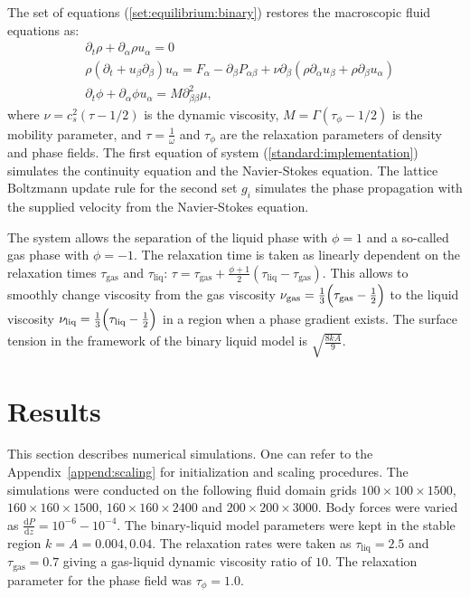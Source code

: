 \documentclass{article}
\begin{document}
The set of equations (\ref{set:equilibrium:binary}) restores the macroscopic
fluid equations as:
\begin{equation}
\label{full:navier:stokes}
\begin{aligned}
&\partial_t \rho+ \partial_{\alpha} \rho u_{\alpha}=0\\
&\rho\left(\partial_t+u_{\beta}\partial_{\beta}\right) u_{\alpha}=F_{\alpha}
-\partial_{\beta}P_{\alpha \beta} +
\nu\partial_{\beta}\left(\rho\partial_{\alpha}u_{\beta}+\rho\partial_{\beta} u_{\alpha}\right)\\
&\partial_t \phi + \partial_{\alpha} \phi u_{\alpha}=M \partial^2_{\beta\beta} \mu,
\end{aligned}
\end{equation}
where $\nu=c_s^2 (\tau-1/2)$ is the dynamic viscosity,
$M=\Gamma(\tau_{\phi}-1/2)$ is the mobility parameter, and $\tau=\frac{1}{\omega}$ and $\tau_{\phi}$
are the relaxation parameters of density and phase fields. The first equation of system
(\ref{standard:implementation}) simulates the continuity equation and the Navier-Stokes equation.
The lattice Boltzmann update rule for the second set $g_i$ simulates the phase propagation with the
supplied velocity from the Navier-Stokes equation.

The system allows the separation of the liquid
phase with $\phi=1$ and a so-called gas phase with $\phi=-1$. The
relaxation time is taken as linearly dependent on the relaxation
times $\tau_{\mathrm{gas}}$ and $\tau_{\mathrm{liq}}$:
$\tau=\tau_{\mathrm{gas}}+\frac{\phi+1}{2}(\tau_{\mathrm{liq}}-\tau_{\mathrm{gas}})$. This allows
to smoothly change viscosity from the gas viscosity
$\nu_{\mathrm{gas}}=\frac{1}{3}\Bigl(\tau_{\mathrm{gas}}-\frac{1}{2}\Bigr)$ to the liquid viscosity
$\nu_{\mathrm{liq}}=\frac{1}{3}\Bigl(\tau_{\mathrm{liq}}-\frac{1}{2}\Bigr)$ in a region when a
phase gradient exists. The surface tension in the framework of the binary liquid model is $\sqrt{\frac{8 k
A}{9}}$.

\section{Results}
\label{sec:results}
This section describes numerical simulations. One can refer to the Appendix~\ref{append:scaling} for
initialization and scaling procedures. The simulations were conducted on the following 
fluid domain grids $100 \times 100 \times 1500$, $160 \times 160 \times 1500$,
$160 \times 160 \times 2400$ and $200 \times 200 \times 3000$. Body forces were varied as
$\frac{\mathrm{d}P}{\mathrm{d}z}=10^{-6}-10^{-4}$. The binary-liquid model parameters were kept in
the stable region $k=A=0.004,0.04$. The relaxation rates were taken as $\tau_{\mathrm{liq}}=2.5$
and $\tau_{\mathrm{gas}}=0.7$ giving a gas-liquid dynamic viscosity ratio of $10$. The relaxation
parameter for the phase field was $\tau_{\phi}=1.0$.
\end{document}
